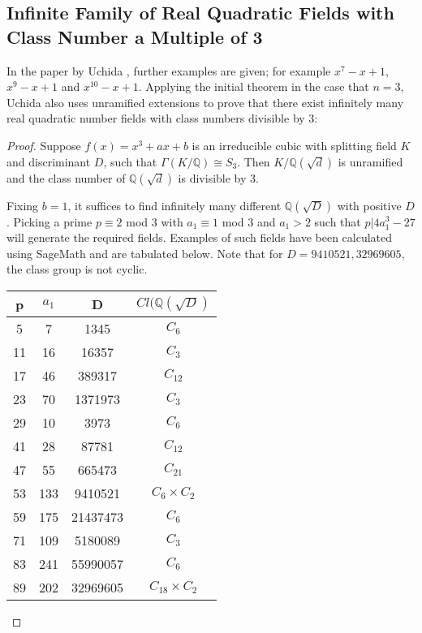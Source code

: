 \documentclass[12pt]{extarticle}
\newcommand{\Q}{\mathbb{Q}}
\newcommand{\<}{\langle}
\renewcommand{\>}{\rangle}
\theoremstyle{definition}
\begin{document}
\subsection{Infinite Family of Real Quadratic Fields with Class Number a Multiple of 3}
In the paper by Uchida \cite{uchida1970}, further examples are given; for example $x^7-x+1$, $x^9-x+1$ and $x^{10}-x+1$. 
Applying the initial theorem in the case that $n=3$, Uchida also uses unramified extensions to prove that there exist infinitely many real quadratic number fields with class numbers divisible by 3:
\begin{proof}
Suppose $f(x) = x^3+ax+b$ is an irreducible cubic with splitting field $K$ and discriminant $D$, such that $\Gamma(K/\Q) \cong S_3$. Then $K/\Q(\sqrt{d})$ is unramified and the class number of $\Q(\sqrt{d})$ is divisible by 3. \par

Fixing $b=1$, it suffices to find infinitely many different $\Q(\sqrt{D})$ with positive $D$. Picking a prime $p \equiv 2$ mod 3 with $a_1 \equiv 1$ mod 3 and $a_1 > 2$ such that $p | 4a_1^3 - 27$ will generate the required fields. Examples of such fields have been calculated using SageMath and are tabulated below. Note that for $D=9410521,32969605$, the class group is not cyclic. 
\begin{center}
 \begin{tabular}{| c | c | c | c |}
 \hline
p & $a_1$ & D & $Cl(\Q(\sqrt{D})$  \\ 
\hline
5 &  7 & 1345 & $C_{6}$ \\
\hline
11 &  16 & 16357 & $C_{3}$ \\
\hline
17 &  46 & 389317 & $C_{12}$ \\
\hline
23 &  70 & 1371973 & $C_{3}$ \\
\hline
29 &  10 & 3973 & $C_{6}$ \\
\hline
41 &  28 & 87781 & $C_{12}$ \\
\hline
47 &  55 & 665473 & $C_{21}$ \\
\hline
53 &  133 & 9410521 & $C_{6} \times C_{2}$ \\
\hline
59 &  175 & 21437473 & $C_{6}$ \\
\hline
71 &  109 & 5180089 & $C_{3}$ \\
\hline
83 &  241 & 55990057 & $C_{6}$ \\
\hline
89 &  202 & 32969605 & $C_{18} \times C_{2}$ \\
\hline
\end{tabular}
\end{center}
\end{proof}
\end{document}
